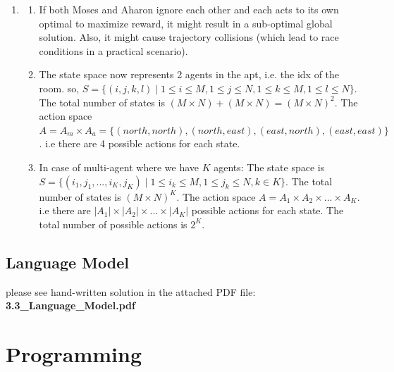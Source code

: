 \documentclass{assignmeownt}
\begin{document}
\begin{enumerate}
    \item
    \begin{enumerate}[label=(\alph*)] 
        \item If both Moses and Aharon ignore each other and each acts to its own optimal to maximize reward, it might result in a sub-optimal global solution. Also, it might cause trajectory collisions (which lead to race conditions in a practical scenario).  
        \item The state space now represents 2 agents in the apt, i.e. the idx of the room. so, $S=\{(i,j,k,l) \mid 1\leq i\leq M, 1\leq j\leq N, 1\leq k\leq M, 1\leq l\leq N\}$. The total number of states is $(M \times N) + (M \times N) = (M \times N)^2$.
        \newline
        The action space $A = A_m \times A_a = \{(north, north), (north, east), (east, north), (east, east)\}$. i.e there are 4 possible actions for each state.
        \item In case of multi-agent where we have $K$ agents:
        \newline
        The state space is $S=\{(i_1,j_1,...,i_K,j_K) \mid 1\leq i_k\leq M, 1\leq j_k\leq N,  k\in K\}$. The total number of states is $(M \times N)^K$.
        \newline
        The action space $A = A_1 \times A_2 \times ... \times A_K$. i.e there are $|A_1| \times |A_2| \times ... \times |A_K|$ possible actions for each state. The total number of possible actions is $2^K$.

    \end{enumerate}

    
    
\end{enumerate} %

\subsection{Language Model} 
    please see hand-written solution in the attached PDF file: \textbf{3.3\_Language\_Model.pdf}


\newpage
\section{Programming}
\end{document}
